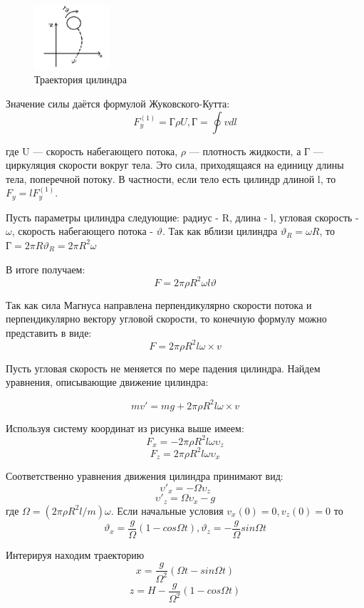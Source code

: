 \documentclass[a4paper]{article}
\begin{document}
\begin{figure}
    \centering
    \includegraphics[width=0.25\textwidth]{pick3.PNG}
    \caption{Траектория цилиндра}
\end{figure}

Значение силы даётся формулой Жуковского-Кутта:
\[F_{y}^{(1)} = \text{Г}\rho U ,\text{Г} = \oint vdl \]

где U — скорость набегающего потока, $\rho  $ — плотность жидкости, а Г — 
циркуляция скорости вокруг тела. Это сила, приходящаяся на единицу 
длины тела, поперечной потоку. В частности, если тело есть цилиндр 
длиной l, то $F_{y} = lF_{y}^{(1)}$.

Пусть параметры цилиндра следующие: радиус - R, длина - l, угловая скорость - $\omega $, скорость набегающего потока - $\vartheta $.
Так как вблизи цилиндра $\vartheta_{R} = \omega R$, то $\text{Г} = 2\pi R \vartheta _{R} = 2\pi R^{2}\omega $\par

В итоге получаем: 
\[F = 2\pi \rho R^{2}\omega l\vartheta \]

Так как сила Магнуса направлена перпендикулярно скорости потока и перпендикулярно вектору угловой скорости,
то конечную формулу можно представить в виде:
\[F = 2\pi \rho R^{2}l\omega \times v\]

Пусть угловая скорость не меняется по мере падения цилиндра. Найдем уравнения, описывающие движение цилиндра:

\[mv' = mg + 2\pi \rho R^2l\omega \times v\]

Используя систему координат из рисунка выше имеем:
\[F_{x} = -2\pi \rho R^2l\omega \upsilon_{z}\]
\[F_{z} = 2\pi \rho R^2l\omega \upsilon_{x}\]

Соответственно уравнения движения цилиндра  принимают вид:
\[\upsilon'_{x} =- \varOmega\upsilon_{z}\]
\[\upsilon'_{z} =\varOmega\upsilon_{x} - g\] 
где $\varOmega = (2\pi \rho R^2l/m)\omega $. Если начальные условия $v_{x}(0) = 0 , v_{z}(0) = 0$ то 
\[\vartheta_{x} = \frac{g}{\varOmega }(1-cos\varOmega t) , \vartheta _{z} =-\frac{g}{\varOmega }sin\varOmega t\]  

Интерируя находим траекторию 
\[x = \frac{g}{\varOmega^2 }(\varOmega t-sin\varOmega t)\]
\[z =H - \frac{g}{\varOmega^2 }(1-cos\varOmega t)\]\par
\newpage
\end{document}
